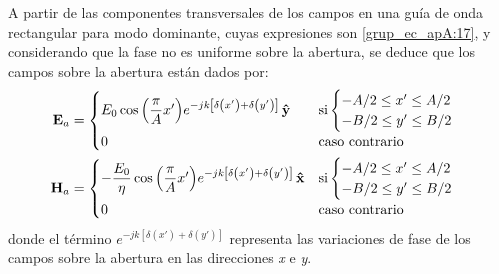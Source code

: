 A partir de las componentes transversales de los campos en una guía de onda rectangular para modo dominante, cuyas expresiones son \eqref{grup_ec_apA:17}, y considerando que la fase no es uniforme sobre la abertura, se deduce que los campos sobre la abertura están dados por:
\begin{align}
\mathbf{E}_a &= 
\begin{cases}
\makebox[0pt][l]{$E_0\cos\left(\dfrac{\pi}{A}x'\right)\!e^{-jk\left[\delta\left(x'\right) + \delta\left(y'\right)\right]}\,\versor{y}$}\hphantom{-\dfrac{E_0}{\eta}\cos\left(\dfrac{\pi}{A}x'\right)\!e^{-jk\left[\delta\left(x'\right) + \delta\left(y'\right)\right]}\,\versor{x}} &\text{si}
\begin{cases} 
-A/2 \leq x' \leq A/2\\
-B/2 \leq y' \leq B/2
\end{cases}\\
0  &\text{caso contrario}
\end{cases}
\label{ec_apB:131}\\
\mathbf{H}_a &= 
\begin{cases} 
-\dfrac{E_0}{\eta}\cos\left(\dfrac{\pi}{A}x'\right)\!e^{-jk\left[\delta\left(x'\right) + \delta\left(y'\right)\right]}\,\versor{x} &\text{si}
\begin{cases} 
-A/2 \leq x' \leq A/2\\
-B/2 \leq y' \leq B/2
\end{cases}\\
0  & \text{caso contrario}
\end{cases}
\label{ec_apB:132}
\end{align}
donde el término $e^{-jk\left[\delta\left(x'\right) + \delta\left(y'\right)\right]}$ representa las variaciones de fase de los campos sobre la abertura en las direcciones \emph{x} e \emph{y}.

